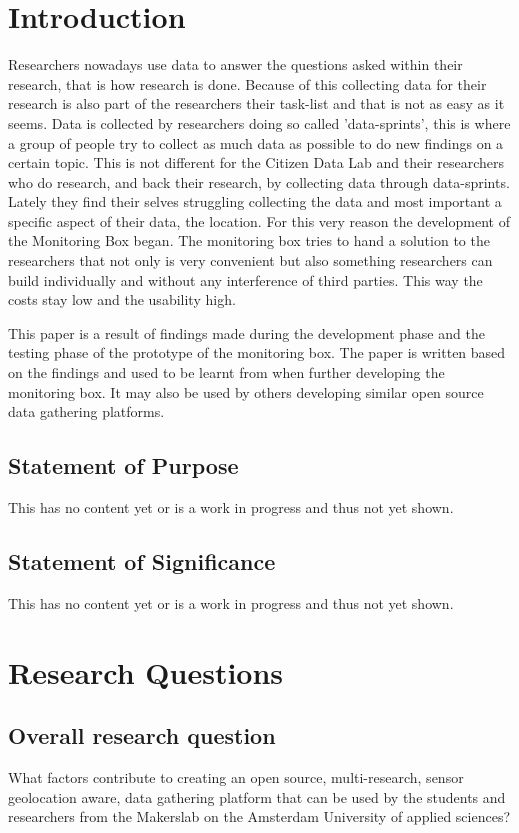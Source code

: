 \documentclass[conference]{IEEEtran}
\begin{document}
\IEEEpeerreviewmaketitle

\section{Introduction}
 Researchers nowadays use data to answer the questions asked within their research, that is how research is done. Because of this collecting data for their research is also part of the researchers their task-list and that is not as easy as it seems. Data is collected by researchers doing so called 'data-sprints', this is where a group of people try to collect as much data as possible to do new findings on a certain topic. This is not different for the Citizen Data Lab and their researchers who do research, and back their research, by collecting data through data-sprints. Lately they find their selves struggling collecting the data and most important a specific aspect of their data, the location. For this very reason the development of the Monitoring Box began. The monitoring box tries to hand a solution to the researchers that not only is very convenient but also something researchers can build individually and without any interference of third parties. This way the costs stay low and the usability high. \par
This paper is a result of findings made during the development phase and the testing phase of the prototype of the monitoring box. The paper is written based on the findings and used to be learnt from when further developing the monitoring box. It may also be used by others developing similar open source data gathering platforms.

\subsection{Statement of Purpose}
This has no content yet or is a work in progress and thus not yet shown. 

\subsection{Statement of Significance}
This has no content yet or is a work in progress and thus not yet shown.

\section{Research Questions}

\subsection{Overall research question}
What factors contribute to creating an open source, multi-research, sensor geolocation aware, data gathering platform that can be used by the students and researchers from the Makerslab on the Amsterdam University of applied sciences?
\end{document}
